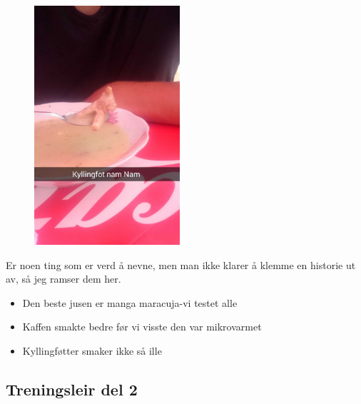 \begin{figure}[h]
	\begin{center}
	\includegraphics[width=0.48\textwidth]{kyllingfot}
	\caption{}
\end{center}
\end{figure}



Er noen ting som er verd å nevne, men man ikke klarer å klemme en
historie ut av, så jeg ramser dem her.

\begin{itemize}
	\item Den beste jusen er manga maracuja-vi testet
			alle
		\item Kaffen smakte bedre før vi visste den var
			mikrovarmet
		\item Kyllingføtter smaker ikke så ille
\end{itemize}


\subsection*{Treningsleir del 2}

